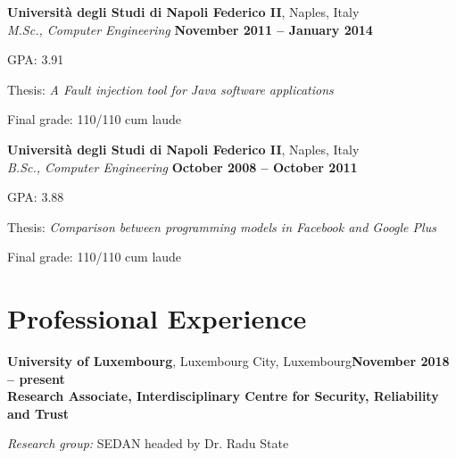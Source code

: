 \documentclass[margin,line]{resume}
\begin{document}
\begin{resume}
\textbf{Universit\`a degli Studi di Napoli Federico II}, Naples, Italy \vspace{1mm}\\%
\textsl{M.Sc., Computer Engineering} \hfill \textbf{November 2011 -- January 2014}\vspace{-3mm}\\\vspace{-1mm}%
\begin{list2}
	\item GPA: 3.91
	\item Thesis: \textsl{A Fault injection tool for Java software applications}
	\item Final grade: 110/110 cum laude
\end{list2}\vspace{-1.5mm}    


\textbf{Universit\`a degli Studi di Napoli Federico II}, Naples, Italy \vspace{1mm}\\%
\textsl{B.Sc., Computer Engineering} \hfill \textbf{October 2008 -- October 2011}\vspace{-3mm}\\\vspace{-1mm}%
\begin{list2}
	\item GPA: 3.88
	\item Thesis: \textsl{Comparison between programming models in Facebook and Google Plus}
        \item Final grade: 110/110 cum laude
\end{list2}\vspace{-1.5mm}    





\section{\mysidestyle Professional Experience}

\textbf{University of Luxembourg}, Luxembourg City, Luxembourg\hfill\textbf{November 2018 -- present}\\
\textbf{Research Associate, Interdisciplinary Centre for Security, Reliability and Trust}\hfill 
\vspace{-3mm}\\\vspace{-1mm}
\begin{list2}
	\item \filbreak\textit{Research group:} SEDAN headed by Dr. Radu State
\end{list2}



\end{resume}
\end{document}
